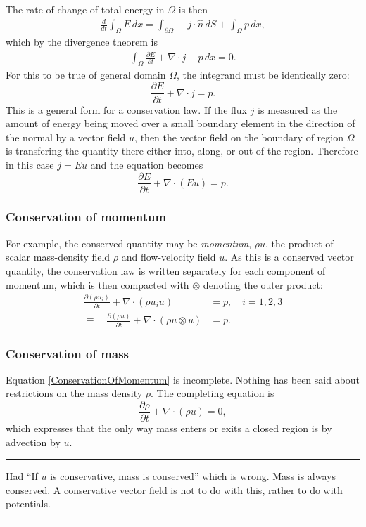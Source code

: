 \documentclass{article}
\newcommand{\todo}[1]{\vskip 0.1in \hrule \vskip 0.03in {#1} \vskip 0.03in \hrule \vskip 0.1in}
\begin{document}
The rate of change of total energy in $\Omega$ is then 
\begin{align*}
    \frac{d}{dt} \int_\Omega E\, dx = \int_{\partial\Omega} -j\cdot \hat{n}\, dS + \int_\Omega p\, dx,
\end{align*}
which by the divergence theorem is
\begin{align*}
    \int_\Omega \frac{\partial E}{\partial t} + \nabla \cdot j - p\, dx = 0.
\end{align*}
For this to be true of general domain $\Omega$, the integrand must be identically zero:
\begin{equation}
    \frac{\partial E}{\partial t} + \nabla \cdot j = p.
\end{equation}
This is a general form for a conservation law. If the flux $j$ is measured as the amount of energy being moved over a small boundary element
in the direction of the normal by a vector field $u$, then the vector field on the boundary of region $\Omega$ is transfering the quantity there either into, along, or out of the region. Therefore in this case $j = E u$ and the equation becomes
\begin{equation}
    \frac{\partial E}{\partial t} + \nabla \cdot (E u) = p.
\end{equation}
\subsubsection{Conservation of momentum}
For example, the conserved quantity may be \textit{momentum}, $\rho u$, the product
of scalar mass-density field $\rho$ and flow-velocity field $u$. As this is a conserved vector quantity, the conservation law is written
separately for each component of momentum, which is then compacted with $\otimes$ denoting the outer product:
\begin{equation}\label{ConservationOfMomentum}
\begin{split}
    \frac{\partial(\rho u_i)}{\partial t} + \nabla \cdot \left(\rho u_i u\right) &= p, \quad i=1,2,3\\
    \equiv\quad \frac{\partial(\rho u)}{\partial t} + \nabla \cdot \left(\rho u \otimes u\right) &= p.
\end{split}
\end{equation}
\subsubsection{Conservation of mass}
Equation \eqref{ConservationOfMomentum} is incomplete. Nothing has been said about restrictions on the mass density $\rho$.
The completing equation is
\begin{equation}\label{ConservationOfMass}
    \frac{\partial \rho}{\partial t} + \nabla \cdot (\rho u) = 0,
\end{equation}
which expresses that the only way mass enters or exits a closed region is by advection by $u$.
\todo{
Had ``If $u$ is conservative, mass is conserved''
which is wrong. Mass is always conserved.
A conservative vector field is not to do with this, rather to do with potentials.
}
\end{document}
